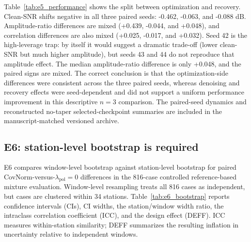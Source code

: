 \documentclass[review,12pt,authoryear]{elsarticle}
\newcommand{\lpol}{\lambda_{\mathrm{pol}}}
\begin{document}
\begin{table}[!htbp]
\centering
\caption{E5 reconstructed no-taper paired selected-checkpoint terminal contrasts. Each row is the within-seed $\lpol=0.5-\lpol=0$ difference using the historical selected checkpoint identities and the frozen no-taper controlled-mixture manifest. These values are target-dependent shared-target diagnostics, not primary report-card rankings and not historical sample-identical reruns of the submitted tapered E5 experiment.}
\label{tab:e5_performance}
\small
\resizebox{\linewidth}{!}{%

}
\end{table}

Table~\ref{tab:e5_performance} shows the split between optimization and recovery. Clean-SNR shifts negative in all three paired seeds: -0.462, -0.063, and -0.088 dB. Amplitude-ratio differences are mixed (+0.439, -0.044, and +0.048), and correlation differences are also mixed (+0.025, -0.017, and +0.032). Seed 42 is the high-leverage trap: by itself it would suggest a dramatic trade-off (lower clean-SNR but much higher amplitude), but seeds 43 and 44 do not reproduce that amplitude effect. The median amplitude-ratio difference is only +0.048, and the paired signs are mixed. The correct conclusion is that the optimization-side differences were consistent across the three paired seeds, whereas denoising and recovery effects were seed-dependent and did not support a uniform performance improvement in this descriptive $n=3$ comparison. The paired-seed dynamics and reconstructed no-taper selected-checkpoint summaries are included in the manuscript-matched versioned archive.

\FloatBarrier

\subsection{E6: station-level bootstrap is required}
\label{sec:e6}
E6 compares window-level bootstrap against station-level bootstrap for paired CovNorm-versus-$\lpol=0$ differences in the 816-case controlled reference-based mixture evaluation. Window-level resampling treats all 816 cases as independent, but cases are clustered within 34 stations. Table~\ref{tab:e6_bootstrap} reports confidence intervals (CIs), CI widths, the station/window width ratio, the intraclass correlation coefficient (ICC), and the design effect (DEFF). ICC measures within-station similarity; DEFF summarizes the resulting inflation in uncertainty relative to independent windows.
\end{document}
